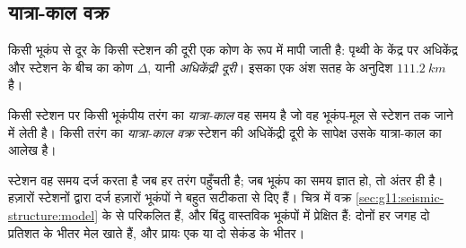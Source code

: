 \subsection{यात्रा-काल वक्र}

किसी भूकंप से दूर के किसी स्टेशन की दूरी एक
कोण के रूप में मापी जाती है: पृथ्वी के केंद्र पर अधिकेंद्र और स्टेशन के बीच का कोण $\Delta$,
यानी \emph{अधिकेंद्री दूरी}। इसका एक
अंश सतह के अनुदिश $\qty{111.2}{km}$ है।

\begin{definition}[यात्रा-काल; यात्रा-काल वक्र]\label{def:g11:seismic-structure:travel-time}
किसी स्टेशन पर किसी भूकंपीय तरंग का \emph{यात्रा-काल} वह
समय है जो वह भूकंप-मूल से स्टेशन तक जाने में लेती है। किसी तरंग का
\emph{यात्रा-काल वक्र} स्टेशन की अधिकेंद्री दूरी के सापेक्ष
उसके यात्रा-काल का आलेख है।
\end{definition}

स्टेशन वह समय दर्ज करता है जब हर तरंग पहुँचती है; जब भूकंप का
समय ज्ञात हो, तो अंतर ही  है। हज़ारों स्टेशनों द्वारा दर्ज हज़ारों
भूकंपों ने  बहुत सटीकता से दिए हैं। चित्र में वक्र
\cref{sec:g11:seismic-structure:model} के  से परिकलित हैं, और
बिंदु वास्तविक भूकंपों में प्रेक्षित  हैं: दोनों हर जगह दो प्रतिशत के
भीतर मेल खाते हैं, और प्रायः एक या दो सेकंड के भीतर।

